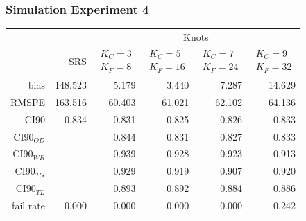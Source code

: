 \documentclass[mathserif,compress]{beamer}\usepackage{graphicx, color}
\begin{document}
\begin{frame}[fragile]
\frametitle{Simulation Experiment 4}

\footnotesize
\begin{table}[ht]
\centering
\begin{tabular}{rrrrrr}
  \hline
  \hline
	&  & \multicolumn{4}{c}{Knots} \\ 
 & SRS & $\begin{array}{c}K_C=3  \\ K_F=8 \end{array}$ & $\begin{array}{c}K_C=5  \\ K_F=16 \end{array}$ & $\begin{array}{c}K_C=7  \\ K_F=24 \end{array}$ & $\begin{array}{c}K_C=9  \\ K_F=32 \end{array}$ \\
  \hline
bias & 148.523 & 5.179 & 3.440 & 7.287 & 14.629 \\ 
  RMSPE & 163.516 & 60.403 & 61.021 & 62.102 & 64.136 \\ 
  CI90 & 0.834 & 0.831 & 0.825 & 0.826 & 0.833 \\ 
  CI90$_{OD}$ &  & 0.844 & 0.831 & 0.827 & 0.833 \\ 
  CI90$_{WR}$ &  & 0.939 & 0.928 & 0.923 & 0.913 \\ 
  CI90$_{TG}$ &  & 0.929 & 0.919 & 0.907 & 0.920 \\ 
  CI90$_{TL}$ &  & 0.893 & 0.892 & 0.884 & 0.886 \\ 
  fail rate & 0.000 & 0.000 & 0.000 & 0.000 & 0.242 \\ 
   \hline
\end{tabular}
\end{table}

\end{frame}

\end{document}
